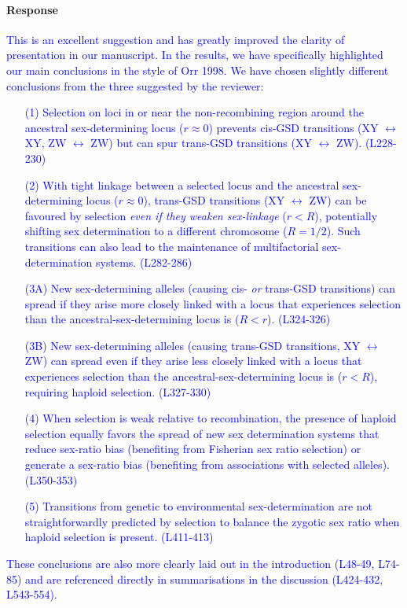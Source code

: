 \documentclass[10pt,letterpaper]{article}
\begin{document}
\noindent\paragraph{Response}
\textcolor{blue}{
This is an excellent suggestion and has greatly improved the clarity of presentation in our manuscript. In the results, we have specifically highlighted our main conclusions in the style of Orr 1998. We have chosen slightly different conclusions from the three suggested by the reviewer: 
\begin{enumerate}
\item[(1)] Selection on loci in or near the non-recombining region around the ancestral sex-determining locus ($r\approx0$) prevents cis-GSD transitions (XY $\leftrightarrow$ XY, ZW $\leftrightarrow$ ZW) but can spur trans-GSD transitions (XY $\leftrightarrow$ ZW). (L228-230)
\item[(2)] With tight linkage between a selected locus and the ancestral sex-determining locus ($r\approx0$), trans-GSD transitions (XY $\leftrightarrow$ ZW) can be favoured by selection \textit{even if they weaken sex-linkage} ($r<R$), potentially shifting sex determination to a different chromosome ($R=1/2$). 
Such transitions can also lead to the maintenance of multifactorial sex-determination systems. (L282-286)
\item[(3A)] New sex-determining alleles (causing cis- \textit{or} trans-GSD transitions) can spread if they arise more closely linked with a locus that experiences selection than the ancestral-sex-determining locus is ($R<r$). (L324-326)
\item[(3B)] New sex-determining alleles (causing trans-GSD transitions, XY $\leftrightarrow$ ZW) can spread even if they arise less closely linked with a locus that experiences selection than the ancestral-sex-determining locus is ($r<R$), requiring haploid selection. (L327-330)
\item[(4)] When selection is weak relative to recombination, the presence of haploid selection equally favors the spread of new sex determination systems that reduce sex-ratio bias (benefiting from Fisherian sex ratio selection) or generate a sex-ratio bias (benefiting from associations with selected alleles). (L350-353)
\item[(5)] Transitions from genetic to environmental sex-determination are not straightforwardly predicted by selection to balance the zygotic sex ratio when haploid selection is present.  (L411-413)
\end{enumerate}
These conclusions are also more clearly laid out in the introduction (L48-49, L74-85) and are referenced directly in summarisations in the discussion (L424-432, L543-554). 
}
\end{document}
